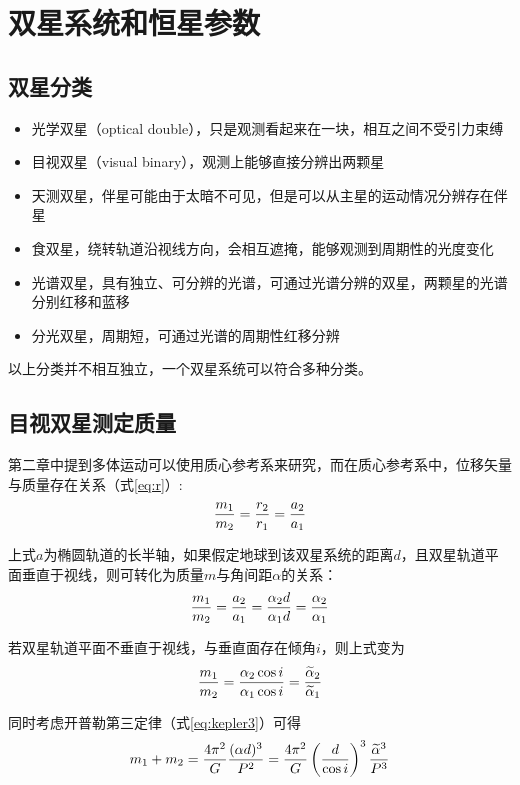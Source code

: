 \chapter{双星系统和恒星参数}
\section{双星分类}
\begin{itemize}
  \item 光学双星（optical double），只是观测看起来在一块，相互之间不受引力束缚
  \item 目视双星（visual binary），观测上能够直接分辨出两颗星
  \item 天测双星，伴星可能由于太暗不可见，但是可以从主星的运动情况分辨存在伴星
  \item 食双星，绕转轨道沿视线方向，会相互遮掩，能够观测到周期性的光度变化
  \item 光谱双星，具有独立、可分辨的光谱，可通过光谱分辨的双星，两颗星的光谱分别红移和蓝移
  \item 分光双星，周期短，可通过光谱的周期性红移分辨
\end{itemize}

以上分类并不相互独立，一个双星系统可以符合多种分类。

\section{目视双星测定质量}
第二章中提到多体运动可以使用质心参考系来研究，而在质心参考系中，位移矢量与质量存在关系（式\ref{eq:r}）:
\begin{equation}
  {m_1\over m_2}={r_2\over r_1}={a_2\over a_1}
\end{equation}

上式$a$为椭圆轨道的长半轴，如果假定地球到该双星系统的距离$d$，且双星轨道平面垂直于视线，则可转化为质量$m$与角间距$\alpha$的关系：
\begin{equation}
  {m_1\over m_2}={a_2\over a_1}={\alpha_2 d\over \alpha_1 d}={\alpha_2\over \alpha_1}
\end{equation}

若双星轨道平面不垂直于视线，与垂直面存在倾角$i$，则上式变为
\begin{equation}
  {m_1\over m_2}={\alpha_2 \cos{i}\over \alpha_1\cos{i}}={\widetilde \alpha_2 \over \widetilde \alpha_1}
  \label{eq:binary1}
\end{equation}

同时考虑开普勒第三定律（式\ref{eq:kepler3}）可得
\begin{equation}
  m_1+m_2={4\pi^2 \over G}{(\alpha d)^3 \over P^2}={4\pi^2\over G}\left({d\over \cos i}\right)^3{\widetilde \alpha^3\over P^3}
  \label{eq:binary2}
\end{equation}

